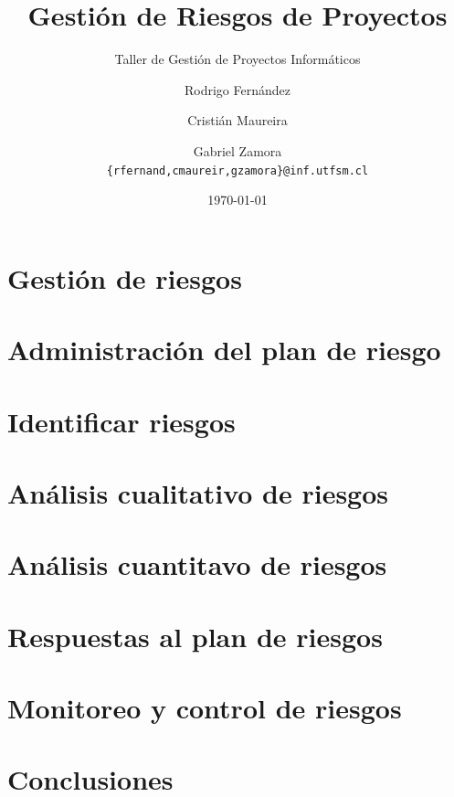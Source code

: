 \documentclass{beamer}
\title{Gestión de Riesgos de Proyectos}
\subtitle{Taller de Gestión de Proyectos Informáticos}
\author[R. Fernández, C. Maureira, G. Zamora]{Rodrigo Fernández \and Cristián Maureira \and Gabriel Zamora\\ \small{\texttt{\{rfernand,cmaureir,gzamora\}@inf.utfsm.cl}}}
\institute[]{Universidad Técnica Federico Santa María}
\date{\today}
\begin{document}
    \frame{\titlepage}
    \frame{\tableofcontents}
	\section{Gestión de riesgos}
	
    \section{Administración del plan de riesgo}
    
    \section{Identificar riesgos}
    
    \section{Análisis cualitativo de riesgos}
    
    \section{Análisis cuantitavo de riesgos}
    
    \section{Respuestas al plan de riesgos}
    
    \section{Monitoreo y control de riesgos}
    
    \section{Conclusiones}
    
\end{document}
